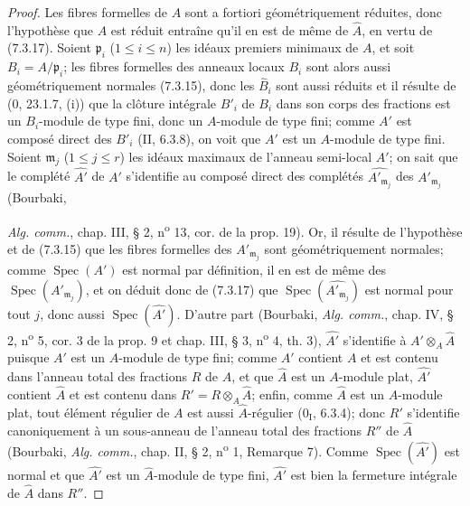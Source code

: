 \begin{proof}
Les fibres formelles de $A$ sont a fortiori géométriquement réduites, donc
l'hypothèse que $A$ est réduit entraîne qu'il en est de même de $\widehat A$,
en vertu de (7.3.17). Soient $\mathfrak p_i$ ($1\leq i\leq n$) les idéaux
premiers minimaux de $A$, et soit $B_i=A/\mathfrak p_i$; les fibres formelles
des anneaux locaux $B_i$ sont alors aussi géométriquement normales (7.3.15),
donc les $\widehat B_i$ sont aussi réduits et il résulte de (0, 23.1.7, (i))
que la clôture intégrale $B'_i$ de $B_i$ dans son corps des fractions est un
$B_i$-module de type fini, donc un $A$-module de type fini; comme $A'$ est
composé direct des $B'_i$ (II, 6.3.8), on voit que $A'$ est un $A$-module de
type fini. Soient $\mathfrak m_j$ ($1\leq j\leq r$) les idéaux maximaux de
l'anneau semi-local $A'$; on sait que le complété $\widehat{A'}$ de $A'$
s'identifie au composé direct des complétés
$\widehat{A'_{\mathfrak m_j}}$ des $A'_{\mathfrak m_j}$ (Bourbaki,


\emph{Alg. comm.}, chap. III, § 2, n\textsuperscript{o} 13, cor. de la prop. 19).
Or, il résulte de l'hypothèse et de (7.3.15) que les fibres formelles des
$A'_{\mathfrak m_j}$ sont géométriquement normales; comme
$\operatorname{Spec}(A')$ est normal par définition, il en est de même des
$\operatorname{Spec}(A'_{\mathfrak m_j})$, et on déduit donc de (7.3.17) que
$\operatorname{Spec}(\widehat{A'_{\mathfrak m_j}})$ est normal pour tout $j$,
donc aussi $\operatorname{Spec}(\widehat{A'})$. D'autre part (Bourbaki,
\emph{Alg. comm.}, chap. IV, § 2, n\textsuperscript{o} 5, cor. 3 de la prop. 9
et chap. III, § 3, n\textsuperscript{o} 4, th. 3), $\widehat{A'}$ s'identifie
à $A'\otimes_A\widehat A$ puisque $A'$ est un $A$-module de type fini; comme
$A'$ contient $A$ et est contenu dans l'anneau total des fractions $R$ de $A$,
et que $\widehat A$ est un $A$-module plat, $\widehat{A'}$ contient
$\widehat A$ et est contenu dans $R'=R\otimes_A\widehat A$; enfin, comme
$\widehat A$ est un $A$-module plat, tout élément régulier de $A$ est aussi
$\widehat A$-régulier (0$_{\mathrm I}$, 6.3.4); donc $R'$ s'identifie
canoniquement à un sous-anneau de l'anneau total des fractions $R''$ de
$\widehat A$ (Bourbaki, \emph{Alg. comm.}, chap. II, § 2,
n\textsuperscript{o} 1, Remarque 7). Comme
$\operatorname{Spec}(\widehat{A'})$ est normal et que $\widehat{A'}$ est un
$\widehat A$-module de type fini, $\widehat{A'}$ est bien la fermeture
intégrale de $\widehat A$ dans $R''$.
\end{proof}

